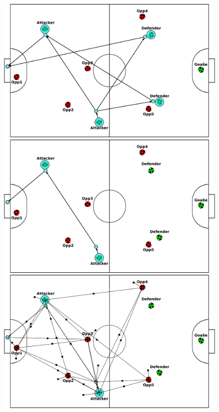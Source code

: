 \documentclass[a4paper, 10pt, conference]{ieeeconf}      %
\begin{document}
\begin{figure}[ht!]
\begin{center}
\includegraphics[totalheight=1.0in]{plan2_resized.eps}
\includegraphics[totalheight=1.0in]{plan3_resized.eps}
\includegraphics[totalheight=1.0in]{plan5_resized.eps}

\end{center}
\end{figure}
\end{document}
